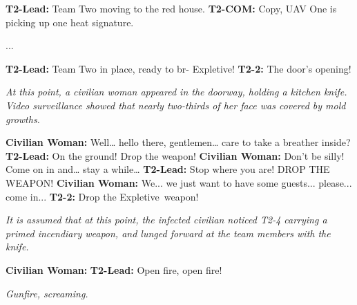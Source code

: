 \begin{boxedminipage}{\textwidth}
\begin{flushleft}

\textbf{T2-Lead:} Team Two moving to the red house.\linebreak
\textbf{T2-COM:} Copy, UAV One is picking up one heat signature.\linebreak

...\linebreak

\textbf{T2-Lead:} Team Two in place, ready to br- \lb Expletive\rb!\linebreak
\textbf{T2-2:} The door's opening!\linebreak

\textsl{At this point, a civilian woman appeared in the doorway, holding a kitchen knife. Video surveillance showed that nearly two-thirds of her face was covered by mold growths.}\linebreak

\textbf{Civilian Woman:} Well… hello there, gentlemen… care to take a breather inside?\linebreak
\textbf{T2-Lead:} On the ground! Drop the weapon!\linebreak
\textbf{Civilian Woman:} Don't be silly! Come on in and… stay a while…\linebreak
\textbf{T2-Lead:} Stop where you are! DROP THE WEAPON!\linebreak
\textbf{Civilian Woman:} We... we just want to have some guests... please... come in...\linebreak
\textbf{T2-2:} Drop the \lb Expletive\rb \ weapon!\linebreak

\textsl{It is assumed that at this point, the infected civilian noticed T2-4 carrying a primed incendiary weapon, and lunged forward at the team members with the knife.}\linebreak

\textbf{Civilian Woman:} \expunged \linebreak
\textbf{T2-Lead:} Open fire, open fire!\linebreak

\textsl{Gunfire, screaming.}
\end{flushleft}
\end{boxedminipage}